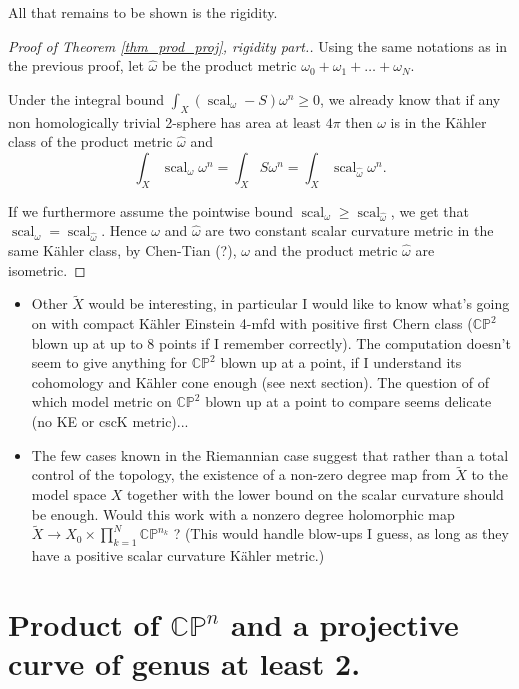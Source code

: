 \documentclass{amsart}
\numberwithin{equation}{section}
\theoremstyle{definition}
\DeclareMathOperator{\scal}{scal}
\begin{document}
All that remains to be shown is the rigidity.
\begin{proof}[Proof of Theorem \ref{thm_prod_proj}, rigidity part.]
Using the same notations as in the previous proof, let $\hat\omega$ be the product metric $\omega_0+\omega_1+\dots+\omega_N$.

Under the integral bound $\int_X(\scal_\omega-S)\omega^n\geq 0$, we already know that if any non homologically trivial 2-sphere has area at least $4\pi$ then $\omega$ is in the K\"ahler class of the product metric $\hat\omega$ and \[\int_X\scal_\omega\omega^n=\int_X S\omega^n=\int_X\scal_{\hat\omega}\omega^n.\]

If we furthermore assume the pointwise bound $\scal_\omega\geq\scal_{\hat\omega}$, we get that $\scal_\omega=\scal_{\hat\omega}$. Hence $\omega$ and $\hat\omega$ are two constant scalar curvature metric in the same K\"ahler class, by Chen-Tian (?), $\omega$ and the product metric $\hat\omega$ are isometric.
\end{proof}



\begin{itemize}
\item Other $\tilde X$ would be interesting, in particular I would like to know what's going on with compact K\"ahler Einstein 4-mfd with positive first Chern class ($\mathbb{CP}^2$ blown up at up to 8 points if I remember correctly). The computation doesn't seem to give anything for $\mathbb{CP}^2$ blown up at a point, if I understand its cohomology and K\"ahler cone enough (see next section). The question of of which model metric on $\mathbb{CP}^2$ blown up at a point to compare seems delicate (no KE or cscK metric)...
\item The few cases known in the Riemannian case suggest that rather than a total control of the topology, the existence of a non-zero degree map from $\tilde X$ to the model space $X$ together with the lower bound on the scalar curvature should be enough. Would this work with a nonzero degree holomorphic map  $\tilde X\to X_0\times\prod_{k=1}^N\mathbb{CP}^{n_k}$ ? (This would handle blow-ups I guess, as long as they have a positive scalar curvature K\"ahler metric.)
\end{itemize}

\section{Product of \texorpdfstring{$\mathbb{CP}^n$}{CPn} and a projective curve of genus at least 2.}
\end{document}
